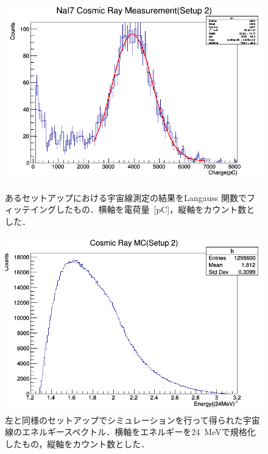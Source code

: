 \begin{figure}[H]
\begin{minipage}{0.45\hsize}
\centering
\hspace*{-1em}
\includegraphics[width=1\textwidth]{figure/tajima/NaI7_Setup2.png}
\caption{あるセットアップにおける宇宙線測定の結果をLangauss 関数でフィッテイングしたもの．横軸を電荷量~[pC]，縦軸をカウント数とした．}\label{langau}
\end{minipage}\hfill
\begin{minipage}{0.45\hsize}
\centering
\includegraphics[width=1\textwidth]{figure/tajima/MC2.png}
\caption{左と同様のセットアップでシミュレーションを行って得られた宇宙線のエネルギースペクトル．横軸をエネルギーを24~MeVで規格化したもの，縦軸をカウント数とした．}\label{MC2}
\end{minipage}
\end{figure}

